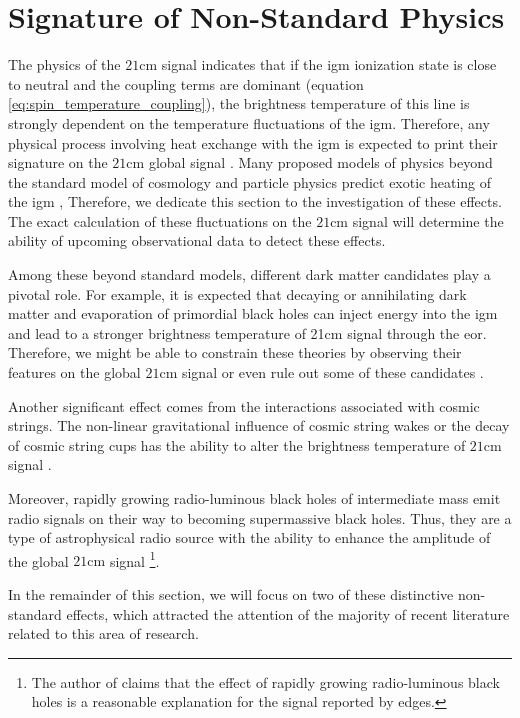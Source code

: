 \documentclass[12pt, TexShade, letterpaper]{report}
\begin{document}
\section{Signature of Non-Standard Physics}
\label{chap:global21cm,sub:non_standard}
The physics of the $\mathrm{21cm}$ signal indicates that if the \gls{igm} ionization state is close to neutral and the coupling terms are dominant (equation \ref{eq:spin_temperature_coupling}), the brightness temperature of this line is strongly dependent on the temperature fluctuations of the \gls{igm}. Therefore, any physical process involving heat exchange with the \gls{igm} is expected to print their signature on the $\mathrm{21cm}$ global signal \cite{21century}. Many proposed models of physics beyond the standard model of cosmology and particle physics predict exotic heating of the 
\gls{igm} \cite{21century}, Therefore, we dedicate this section to the investigation of these effects. The exact calculation of these fluctuations on the $\mathrm{21cm}$ signal will determine the ability of upcoming observational data to detect these effects.\par
Among these beyond standard models, different dark matter candidates play a pivotal role. For example, it is expected that decaying or annihilating dark matter and evaporation of primordial black holes can inject energy into the \gls{igm} and lead to a stronger brightness temperature of 21cm signal through the \gls{eor}. Therefore, we might be able to constrain these theories by observing their features on the global $\mathrm{21cm}$ signal \cite{primordial_bh, new_physics_thesis, primordial_bh_binary, 21limit_dm_bh, bound_dm} or even rule out some of these candidates \cite{rule_out}.\par
Another significant effect comes from the interactions associated with cosmic strings. The non-linear gravitational influence of cosmic string wakes or the decay of cosmic string cups has the ability to alter the brightness temperature of $\mathrm{21cm}$ signal \cite{WF_effect_oscar, cosmic_string_oscar, string_loop_robert}. \par
Moreover, rapidly growing radio-luminous black holes of intermediate mass emit radio signals on their way to becoming supermassive black holes. Thus, they are a type of astrophysical radio source with the ability to enhance the amplitude of the global $\mathrm{21cm}$ signal \cite{bh_cosmioc_dawn} \footnote{The author of \cite{bh_cosmioc_dawn} claims that the effect of rapidly growing radio-luminous black holes is a reasonable explanation for the signal reported by \gls{edges}.}. \par
In the remainder of this section, we will focus on two of these distinctive non-standard effects, which attracted the attention of the majority of recent literature related to this area of research.\par
\end{document}
